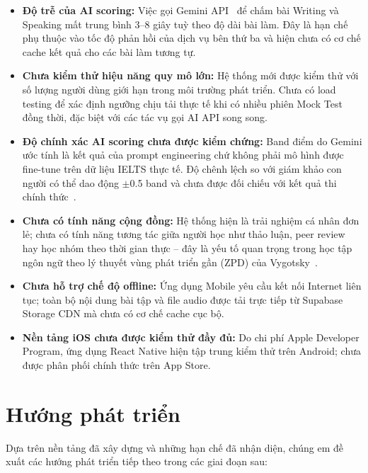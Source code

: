 \documentclass[a4paper,12pt]{extreport}
\begin{document}
\begin{itemize}
    \item \textbf{Độ trễ của AI scoring:} Việc gọi Gemini API~\cite{gemini-api} để chấm bài Writing và Speaking mất trung bình 3--8 giây tuỳ theo độ dài bài làm. Đây là hạn chế phụ thuộc vào tốc độ phản hồi của dịch vụ bên thứ ba và hiện chưa có cơ chế cache kết quả cho các bài làm tương tự.

    \item \textbf{Chưa kiểm thử hiệu năng quy mô lớn:} Hệ thống mới được kiểm thử với số lượng người dùng giới hạn trong môi trường phát triển. Chưa có load testing để xác định ngưỡng chịu tải thực tế khi có nhiều phiên Mock Test đồng thời, đặc biệt với các tác vụ gọi AI API song song.

    \item \textbf{Độ chính xác AI scoring chưa được kiểm chứng:} Band điểm do Gemini ước tính là kết quả của prompt engineering chứ không phải mô hình được fine-tune trên dữ liệu IELTS thực tế. Độ chênh lệch so với giám khảo con người có thể dao động $\pm$0.5 band và chưa được đối chiếu với kết quả thi chính thức~\cite{bachman1990fundamental}.

    \item \textbf{Chưa có tính năng cộng đồng:} Hệ thống hiện là trải nghiệm cá nhân đơn lẻ; chưa có tính năng tương tác giữa người học như thảo luận, peer review hay học nhóm theo thời gian thực -- đây là yếu tố quan trọng trong học tập ngôn ngữ theo lý thuyết vùng phát triển gần (ZPD) của Vygotsky~\cite{vygotsky1978mind}.

    \item \textbf{Chưa hỗ trợ chế độ offline:} Ứng dụng Mobile yêu cầu kết nối Internet liên tục; toàn bộ nội dung bài tập và file audio được tải trực tiếp từ Supabase Storage CDN mà chưa có cơ chế cache cục bộ.

    \item \textbf{Nền tảng iOS chưa được kiểm thử đầy đủ:} Do chi phí Apple Developer Program, ứng dụng React Native hiện tập trung kiểm thử trên Android; chưa được phân phối chính thức trên App Store.
\end{itemize}

\section{Hướng phát triển}

Dựa trên nền tảng đã xây dựng và những hạn chế đã nhận diện, chúng em đề xuất các hướng phát triển tiếp theo trong các giai đoạn sau:
\end{document}
